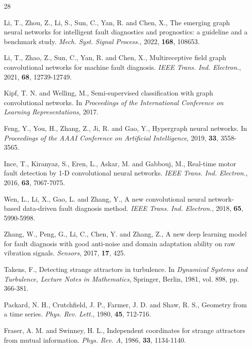 \begin{thebibliography}{28}

 Li, T., Zhou, Z., Li, S., Sun, C., Yan, R. and Chen, X., The emerging graph neural networks for intelligent fault diagnostics and prognostics: a guideline and a benchmark study. \textit{Mech. Syst. Signal Process.}, 2022, \textbf{168}, 108653.

 Li, T., Zhao, Z., Sun, C., Yan, R. and Chen, X., Multireceptive field graph convolutional networks for machine fault diagnosis. \textit{IEEE Trans. Ind. Electron.}, 2021, \textbf{68}, 12739-12749.

 Kipf, T. N. and Welling, M., Semi-supervised classification with graph convolutional networks. In \textit{Proceedings of the International Conference on Learning Representations}, 2017.

 Feng, Y., You, H., Zhang, Z., Ji, R. and Gao, Y., Hypergraph neural networks. In \textit{Proceedings of the AAAI Conference on Artificial Intelligence}, 2019, \textbf{33}, 3558-3565.

 Ince, T., Kiranyaz, S., Eren, L., Askar, M. and Gabbouj, M., Real-time motor fault detection by 1-D convolutional neural networks. \textit{IEEE Trans. Ind. Electron.}, 2016, \textbf{63}, 7067-7075.

 Wen, L., Li, X., Gao, L. and Zhang, Y., A new convolutional neural network-based data-driven fault diagnosis method. \textit{IEEE Trans. Ind. Electron.}, 2018, \textbf{65}, 5990-5998.

 Zhang, W., Peng, G., Li, C., Chen, Y. and Zhang, Z., A new deep learning model for fault diagnosis with good anti-noise and domain adaptation ability on raw vibration signals. \textit{Sensors}, 2017, \textbf{17}, 425.

 Takens, F., Detecting strange attractors in turbulence. In \textit{Dynamical Systems and Turbulence, Lecture Notes in Mathematics}, Springer, Berlin, 1981, vol. 898, pp. 366-381.

 Packard, N. H., Crutchfield, J. P., Farmer, J. D. and Shaw, R. S., Geometry from a time series. \textit{Phys. Rev. Lett.}, 1980, \textbf{45}, 712-716.

 Fraser, A. M. and Swinney, H. L., Independent coordinates for strange attractors from mutual information. \textit{Phys. Rev. A}, 1986, \textbf{33}, 1134-1140.


\end{thebibliography}
